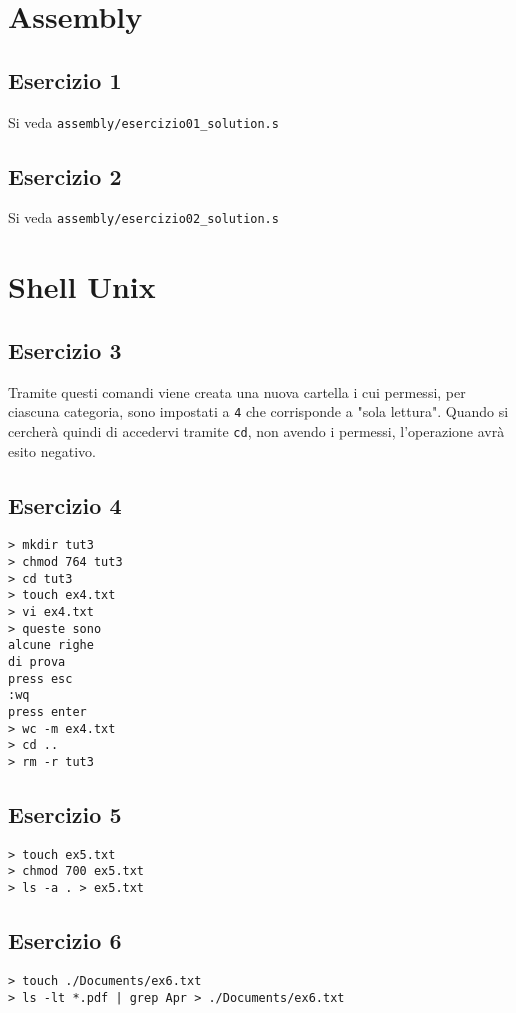 \documentclass{article}
\def\code#1{\texttt{#1}}
\newcommand\tab[1][0.4cm]{\hspace*{#1}}
\begin{document}
\section*{Assembly}
\subsection*{Esercizio 1}
Si veda \code{assembly/esercizio01\_solution.s}

\subsection*{Esercizio 2}
Si veda \code{assembly/esercizio02\_solution.s}

\section*{Shell Unix}
\subsection*{Esercizio 3}
Tramite questi comandi viene creata una nuova cartella i cui permessi, per ciascuna categoria, sono impostati a \code{4} che corrisponde a "sola lettura". Quando si cercherà quindi di accedervi tramite \code{cd}, non avendo i permessi, l'operazione avrà esito negativo.

\subsection*{Esercizio 4}
\code{> mkdir tut3\\
> chmod 764 tut3\\
> cd tut3\\
> touch ex4.txt\\
> vi ex4.txt\\
> queste sono\\
\tab alcune righe\\
\tab di prova\\
press esc\\
:wq\\
press enter\\
> wc -m ex4.txt\\
> cd ..\\
> rm -r tut3
}

\subsection*{Esercizio 5}
\code{> touch ex5.txt\\
> chmod 700 ex5.txt\\
> ls -a . > ex5.txt
}

\subsection*{Esercizio 6}
\code{> touch ./Documents/ex6.txt\\
> ls -lt *.pdf | grep Apr > ./Documents/ex6.txt}
\end{document}

